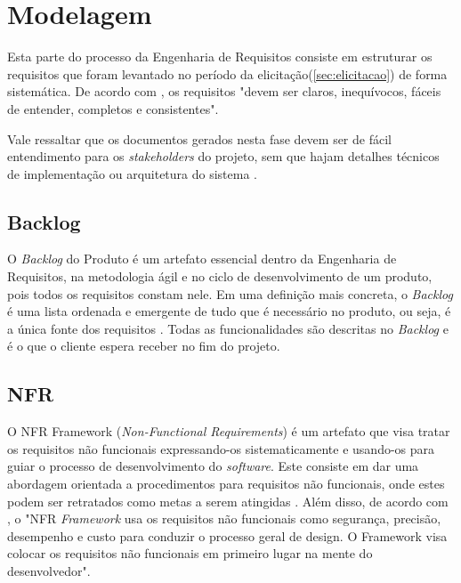 \section {Modelagem}

\label{sec:modelagem}

Esta parte do processo da Engenharia de Requisitos consiste em estruturar os requisitos que foram levantado no período da elicitação(\ref{sec:elicitacao}) de forma sistemática. De acordo com \cite{Sommerville10}, os requisitos "devem ser claros, inequívocos, fáceis de entender, completos e consistentes".

Vale ressaltar que os documentos gerados nesta fase devem ser de fácil entendimento para os \textit{stakeholders} do projeto, sem que hajam detalhes técnicos de implementação ou arquitetura do sistema \cite{Sommerville10}.

\subsection{Backlog}

\label{sec:backlog}

O \textit{Backlog} do Produto é um artefato essencial dentro da Engenharia de Requisitos, na metodologia ágil e no ciclo de desenvolvimento de um produto, pois todos os requisitos constam nele. Em uma definição mais concreta, o \textit{Backlog} é uma lista ordenada e emergente de tudo que é necessário no produto, ou seja, é a única fonte dos requisitos \cite{carolipaulo2021}. Todas as funcionalidades são descritas no \textit{Backlog} e é o que o cliente espera receber no fim do projeto.

\subsection{NFR}
O NFR Framework (\textit{Non-Functional Requirements}) é um artefato que visa tratar os requisitos não funcionais expressando-os sistematicamente e usando-os para guiar o processo de desenvolvimento do \textit{software}. Este consiste em dar uma abordagem orientada a procedimentos para requisitos não funcionais, onde estes podem ser retratados como metas a serem atingidas \cite{coutoproposta}. Além disso, de acordo com \cite{chung2012non}, o "NFR \textit{Framework} usa os requisitos não funcionais como segurança, precisão, desempenho e custo para conduzir o processo geral de design. O Framework visa colocar os requisitos não funcionais em primeiro lugar na mente do desenvolvedor".

